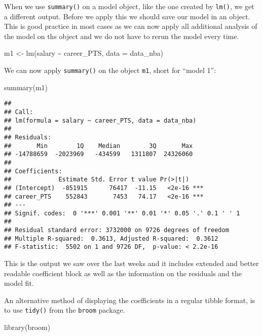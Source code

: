 \documentclass[
]{book}
\newenvironment{Shaded}{\begin{snugshade}}{\end{snugshade}}
\newcommand{\AttributeTok}[1]{\textcolor[rgb]{0.77,0.63,0.00}{#1}}
\newcommand{\FunctionTok}[1]{\textcolor[rgb]{0.00,0.00,0.00}{#1}}
\newcommand{\NormalTok}[1]{#1}
\newcommand{\OtherTok}[1]{\textcolor[rgb]{0.56,0.35,0.01}{#1}}
\newcommand{\SpecialCharTok}[1]{\textcolor[rgb]{0.00,0.00,0.00}{#1}}
\begin{document}
When we use \texttt{summary()} on a model object, like the one created by \texttt{lm()}, we
get a different output. Before we apply this we should save our model in an
object. This is good practice in most cases as we can now apply all additional
analysis of the model on ths object and we do not have to rerun the model
every time.

\begin{Shaded}
\begin{Highlighting}[]
\NormalTok{m1 }\OtherTok{\textless{}{-}} \FunctionTok{lm}\NormalTok{(salary }\SpecialCharTok{\textasciitilde{}}\NormalTok{ career\_PTS, }\AttributeTok{data =}\NormalTok{ data\_nba)}
\end{Highlighting}
\end{Shaded}

We can now apply \texttt{summary()} on the object \texttt{m1}, short for ``model 1'':

\begin{Shaded}
\begin{Highlighting}[]
\FunctionTok{summary}\NormalTok{(m1)}
\end{Highlighting}
\end{Shaded}

\begin{verbatim}
## 
## Call:
## lm(formula = salary ~ career_PTS, data = data_nba)
## 
## Residuals:
##       Min        1Q    Median        3Q       Max 
## -14788659  -2023969   -434599   1311807  24326060 
## 
## Coefficients:
##             Estimate Std. Error t value Pr(>|t|)    
## (Intercept)  -851915      76417  -11.15   <2e-16 ***
## career_PTS    552843       7453   74.17   <2e-16 ***
## ---
## Signif. codes:  0 '***' 0.001 '**' 0.01 '*' 0.05 '.' 0.1 ' ' 1
## 
## Residual standard error: 3732000 on 9726 degrees of freedom
## Multiple R-squared:  0.3613, Adjusted R-squared:  0.3612 
## F-statistic:  5502 on 1 and 9726 DF,  p-value: < 2.2e-16
\end{verbatim}

This is the output we saw over the last weeks and it includes extended and
better readable coefficient block as well as the information on the residuals
and the model fit.

An alternative method of displaying the coefficients in a regular tibble format,
is to use \texttt{tidy()} from the \texttt{broom} package.

\begin{Shaded}
\begin{Highlighting}[]
\FunctionTok{library}\NormalTok{(broom)}
\end{Highlighting}
\end{Shaded}
\end{document}
